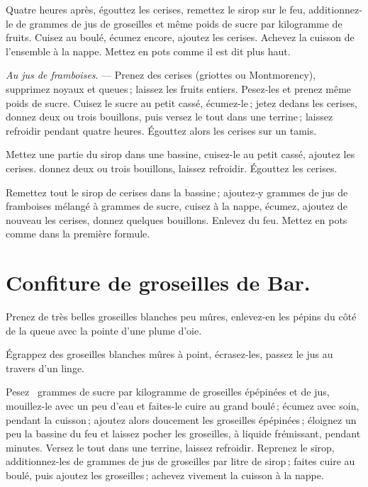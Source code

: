 Quatre heures après, égouttez les cerises, remettez le sirop sur le feu,
additionnez-le de {\mmm} grammes de jus de groseilles et même poids de
sucre par kilogramme de fruits. Cuisez au boulé, écumez encore, ajoutez les
cerises. Achevez la cuisson de l’ensemble à la nappe. Mettez en pots comme il
est dit plus haut.

\sk

\textit{Au jus de framboises}. — Prenez des cerises (griottes ou Montmorency),
supprimez noyaux et queues ; laissez les fruits entiers. Pesez-les et prenez
même poids de sucre. Cuisez le sucre au petit cassé, écumez-le ; jetez dedans
les cerises, donnez deux ou trois bouillons, puis versez le tout dans une
terrine ; laissez refroidir pendant quatre heures. Égouttez alors les cerises
sur un tamis.

Mettez une partie du sirop dans une bassine, cuisez-le au petit cassé, ajoutez
les cerises. donnez deux ou trois bouillons, laissez refroidir. Égouttez les
cerises.

Remettez tout le sirop de cerises dans la bassine ; ajoutez‑y {\mmm}
grammes de jus de framboises mélangé à {\mmm} grammes de sucre, cuisez
à la nappe, écumez, ajoutez de nouveau les cerises, donnez quelques bouillons.
Enlevez du feu. Mettez en pots comme dans la première formule.

\section*{\centering Confiture de groseilles de Bar.}
{}

Prenez de très belles groseilles blanches peu mûres, enlevez-en les pépins du
côté de la queue avec la pointe d'une plume d’oie.

Égrappez des groseilles blanches mûres à point, écrasez-les, passez le jus au
travers d'un linge.

Pesez {\mmm} {\mmm} grammes de sucre par kilogramme de groseilles
épépinées et de jus, mouillez-le avec un peu d'eau et faites-le cuire au grand
boulé ; écumez avec soin, pendant la cuisson ; ajoutez alors doucement les
groseilles épépinées ; éloignez un peu la bassine du feu et laissez pocher les
groseilles, à liquide frémissant, pendant {\mmm} minutes. Versez le tout
dans une terrine, laissez refroidir. Reprenez le sirop, additionnez-les de
{\mmm} grammes de jus de groseilles par litre de sirop ; faites cuire au
boulé, puis ajoutez les groseilles ; achevez vivement la cuisson à la nappe.

